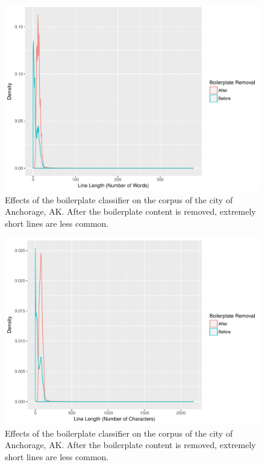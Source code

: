 \documentclass[11pt]{article}
\begin{document}
\begin{figure}[htp]
	\centering
	\caption{Effects of the boilerplate classifier on the corpus of the city of Anchorage, AK. After the boilerplate content is removed, extremely short lines are less common.}
	\label{boilerplate_before_after1}
	\includegraphics[width=\linewidth]{figures/boilerplateBeforeAfterNwords.pdf}
\end{figure}
\begin{figure}[htp]
	\centering
	\caption{Effects of the boilerplate classifier on the corpus of the city of Anchorage, AK. After the boilerplate content is removed, extremely short lines are less common.}
	\label{boilerplate_before_after2}
	\includegraphics[width=\linewidth]{figures/boilerplateBeforeAfterNchars.pdf}
\end{figure}
\end{document}
